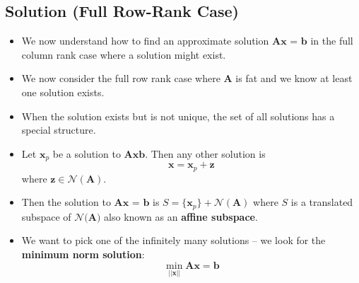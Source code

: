 \subsection{Solution (Full Row-Rank Case)}
\begin{itemize}
    \item We now understand how to find an approximate solution \(\textbf{Ax = b}\) in the full column rank case where a solution might exist.
    \item We now consider the full row rank case where \(\textbf{A}\) is fat and we know at least one solution exists.
    \item When the solution exists but is not unique, the set of all solutions has a special structure.
    \item Let \(\textbf{x}_p\) be a solution to \(\textbf{Ax}\textbf{b}\). Then any other solution is \[
    \textbf{x} = \textbf{x}_p
 + \textbf{z}\]
 where \(\textbf{z} \in \mathcal{N}(\textbf{A})    \).
    \item Then the solution to \(\textbf{Ax = b}\) is \(S = \{\textbf{x}_p\} + \mathcal{N}(\textbf{A})\) where \(S\) is a translated subspace of \(\mathcal{N}(\textbf{A)}\) also known as an \textbf{affine subspace}.
    \item We want to pick one of the infinitely many solutions – we look for the \textbf{minimum norm solution}: 
    \[ \min_{||\textbf{x}||} \textbf{Ax} = \textbf{b}\]
\end{itemize}




